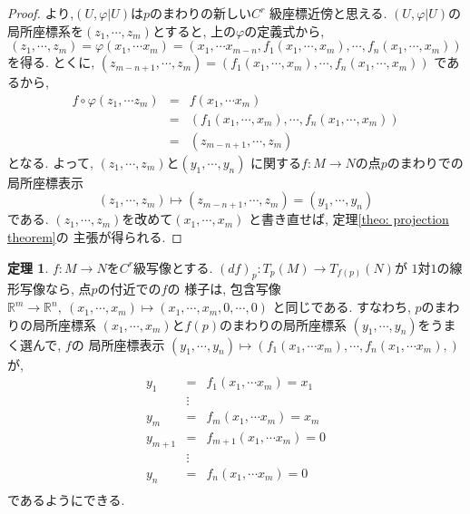 \documentclass[a4j,12pt]{jarticle}
\theoremstyle{definition}
\newtheorem{theorem}{定理}[section]
\begin{document}
\begin{proof}
より,$(U, \varphi|U)$は$p$のまわりの新しい$C^r$
級座標近傍と思える. $(U, \varphi|U)$の
局所座標系を$(z_1,\cdots ,z_m)$とすると, 
上の$\varphi$の定義式から, 
$$(z_1,\cdots ,z_m)=\varphi(x_1,\cdots x_m)
=(x_1,\cdots x_{m-n},f_1(x_1,\cdots ,x_m), 
\cdots ,f_n(x_1,\cdots ,x_m))$$
を得る. とくに, $(z_{m-n+1},\cdots ,z_m)
=(f_1(x_1,\cdots ,x_m), 
\cdots ,f_n(x_1,\cdots ,x_m))$
であるから, 
\begin{eqnarray*}
    f\circ \varphi (z_1,\cdots z_m)&=&f(x_1,\cdots x_m)\\
    &=&(f_1(x_1,\cdots ,x_m),\cdots ,f_n(x_1,\cdots ,x_m))\\
    &=&(z_{m-n+1},\cdots ,z_m)
\end{eqnarray*}
となる. よって, $(z_1,\cdots ,z_m)$と$(y_1,\cdots ,y_n)$
に関する$f:M\to N$の点$p$のまわりでの局所座標表示
$$(z_1,\cdots ,z_m)\mapsto (z_{m-n+1},\cdots ,z_m)
=(y_1,\cdots ,y_n)$$
である. $(z_1,\cdots ,z_m)$を改めて$(x_1,\cdots ,x_m)$
と書き直せば, 定理\ref{theo: projection theorem}の
主張が得られる. 
\end{proof}
\begin{theorem}\label{theo:inclusion map theorem}
    $f:M\to N$を$C^r$級写像とする. 
    $(df)_p:T_p(M)\to T_{f(p)}(N)$が
    $1$対$1$の線形写像なら, 点$p$の付近での$f$の
    様子は, 包含写像
    $\mathbb{R}^m\to \mathbb{R}^n,\ 
    (x_1,\cdots ,x_m)\mapsto 
    (x_1,\cdots ,x_m,0,\cdots ,0)$
    と同じである. すなわち, $p$のまわりの局所座標系
    $(x_1,\cdots ,x_m)$と$f(p)$のまわりの局所座標系
    $(y_1,\cdots ,y_n)$をうまく選んで, $f$の
    局所座標表示
    $(y_1,\cdots ,y_n)\mapsto (f_1(x_1,\cdots x_m),
    \cdots ,f_n(x_1,\cdots x_m),)$が, 
    \begin{eqnarray*}
        y_1&=&f_1(x_1,\cdots x_m)=x_1\\
        &\vdots& \\
        y_m&=&f_m(x_1,\cdots x_m)=x_m\\
        y_{m+1}&=&f_{m+1}(x_1,\cdots x_m)=0\\
        &\vdots& \\
        y_n&=&f_n(x_1,\cdots x_m)=0\\
    \end{eqnarray*}
    であるようにできる. 
\end{theorem}
\end{document}
